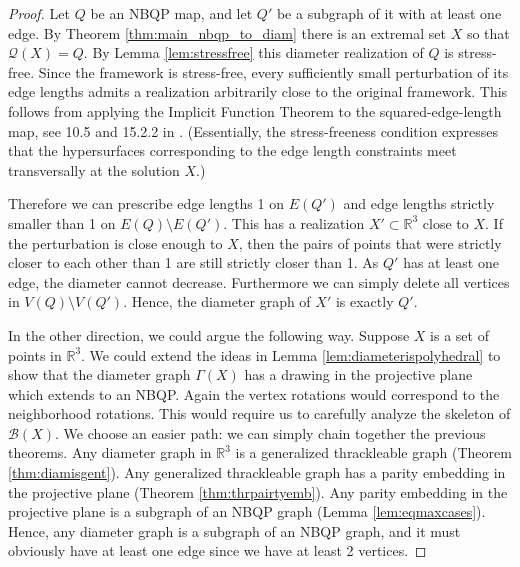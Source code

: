 \documentclass{article}
\newcommand{\R}[0]{\mathbb{R}}
\newcommand{\Bc}[0]{\mathcal{B}}
\newcommand{\qt}{\mathcal{Q}}
\begin{document}
\begin{proof}
    Let $Q$ be an NBQP map, and let $Q'$ be a subgraph of it with at least one edge. By Theorem \ref{thm:main_nbqp_to_diam} there is an extremal set $X$ so that $\qt(X)=Q$. By Lemma \ref{lem:stressfree} this diameter realization of $Q$ is stress-free. Since the framework is stress-free, every sufficiently small perturbation of its edge lengths admits a realization arbitrarily close to the original framework.  This follows from applying the Implicit Function Theorem to the squared-edge-length map, see 10.5 and 15.2.2 in \cite{lovasz2019graphs}. (Essentially, the stress-freeness condition expresses that the hypersurfaces corresponding to the edge length constraints meet transversally at the solution $X$.) 

    Therefore we can prescribe edge lengths 1 on $E(Q')$ and edge lengths strictly smaller than 1 on $E(Q)\setminus E(Q')$. This has a realization $X'\subset \R^3$ close to $X$.  If the perturbation is close enough to $X$, then the pairs of points that were strictly closer to each other than 1 are still strictly closer than 1. As $Q'$ has at least one edge, the diameter cannot decrease. Furthermore we can simply delete all vertices in $V(Q)\setminus V(Q')$. Hence, the diameter graph of $X'$ is exactly $Q'$. 

    In the other direction, we could argue the following way. Suppose $X$ is a set of points in $\R^3$. We could extend the ideas in Lemma \ref{lem:diameterispolyhedral} to show that the diameter graph $\Gamma(X)$ has a drawing in the projective plane which extends to an NBQP. Again the vertex rotations would correspond to the neighborhood rotations. This would require us to carefully analyze the skeleton of $\Bc(X)$. We choose an easier path: we can simply chain together the previous theorems. Any diameter graph in $\R^3$ is a generalized thrackleable graph (Theorem \ref{thm:diamisgent}). Any generalized thrackleable graph has a parity embedding in the projective plane (Theorem \ref{thm:thrpairtyemb}). Any parity embedding in the projective plane is a subgraph of an NBQP graph (Lemma \ref{lem:eqmaxcases}).  Hence, any diameter graph is a subgraph of an NBQP graph, and it must obviously have at least one edge since we have at least 2 vertices. 
       
\end{proof}
\end{document}
